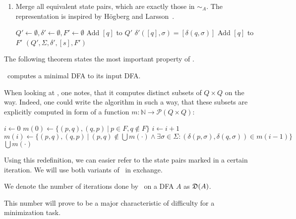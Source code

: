 \begin{enumerate}
	\item Merge all equivalent state pairs, which are exactly those in $\sim_A$. The representation is inspired by Högberg and Larsson~\cite[p.~10]{HL20}.
	
	\vspace{0.2cm}
	\begin{algorithmic}[1] \label{ch:2:minmerge}
            \State $Q' \gets \emptyset, \delta' \gets \emptyset, F' \gets \emptyset$
                \State Add $[q]$ to $Q'$ 
                    \State $\delta'([q], \sigma) = [\delta(q, \sigma)]$
                \EndFor
                    \State Add $[q]$ to $F'$
                \EndIf
            \EndFor
			\State \Return $(Q', \Sigma, \delta', [s], F')$
		\EndFunction
	\end{algorithmic}
\end{enumerate}
The following theorem states the most important property of \MinAlg.

\begin{theorem}\label{ch:2:min-alg-correct}\textnormal{\cite[pp. 162-164]{HMU01}}
	\MinAlg\ computes a minimal DFA to its input DFA.
\end{theorem}

\noindent When looking at \CompDist, one notes, that it computes distinct subsets of $Q \times Q$ on the way. Indeed, one could write the algorithm in such a way, that these subsets are explicitly computed in form of a function $m\colon\mathbb{N}\to\mathcal{P}(Q\times Q)$:
\vspace{0.2cm}
\begin{algorithmic}[1] \label{ch:2:m-minmark}
	\State $i \gets 0$
	\State $m(0) \gets \{ (p,q), (q,p)\ |\ p \in F, q \notin F \}$
	\Do
		\State $i \gets i + 1$
		\State $m(i) \gets \{ (p,q), (q,p)\ |\ (p,q) \notin \bigcup{m(\cdot)} \land \exists \sigma \in \Sigma \colon (\delta(p,\sigma), \delta(q,\sigma)) \in m(i-1) \}$
	\State \Return $\bigcup{m(\cdot)}$
	\EndFunction
\end{algorithmic}
\vspace{0.2cm}
Using this redefinition, we can easier refer to the state pairs marked in a certain iteration. We will use both variants of \CompDist\ in exchange.
\begin{definition}\label{ch:2:def:D(A)}
	We denote the number of iterations done by \CompDist\ on a DFA $A$ as $\mathfrak{D}(A)$.
\end{definition}
\noindent This number will prove to be a major characteristic of difficulty for a minimization task.

